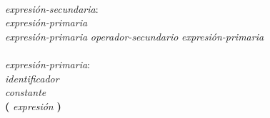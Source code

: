 \begin{tabbing}
\- \\ \textit{expresión-secundaria}: \+ \\
    \textit{expresión-primaria} \\
    \textit{expresión-primaria} \textit{operador-secundario} \textit{expresión-primaria}\\

\- \\ \textit{expresión-primaria}: \+ \\
    \textit{identificador} \\
    \textit{constante} \\
    \textbf{(} \textit{expresión} \textbf{)}\\

\end{tabbing}

